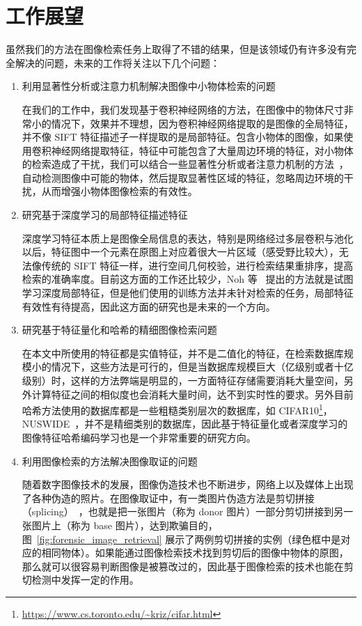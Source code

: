 \section{工作展望}
虽然我们的方法在图像检索任务上取得了不错的结果，但是该领域仍有许多没有完全解决的问题，未来的工作将关注以下几个问题：

\begin{enumerate}
\item 利用显著性分析或注意力机制解决图像中小物体检索的问题

在我们的工作中，我们发现基于卷积神经网络的方法，在图像中的物体尺寸非常小的情况下，效果并不理想，因为卷积神经网络提取的是图像的全局特征，并不像 SIFT 特征描述子一样提取的是局部特征。包含小物体的图像，如果使用卷积神经网络提取特征，特征中可能包含了大量周边环境的特征，对小物体的检索造成了干扰，我们可以结合一些显著性分析或者注意力机制的方法~\cite{Song2017DeepSA,Xiao2015TheAO,Zheng2017LearningMC}，自动检测图像中可能的物体，然后提取显著性区域的特征，忽略周边环境的干扰，从而增强小物体图像检索的有效性。

\item 研究基于深度学习的局部特征描述特征

深度学习特征本质上是图像全局信息的表达，特别是网络经过多层卷积与池化以后，特征图中一个元素在原图上对应着很大一片区域（感受野比较大），无法像传统的 SIFT 特征一样，进行空间几何校验，进行检索结果重排序，提高检索的准确率度。目前这方面的工作还比较少，Noh 等~\cite{Noh2017LargeScaleIR} 提出的方法就是试图学习深度局部特征，但是他们使用的训练方法并未针对检索的任务，局部特征有效性有待提高，因此这方面的研究也是未来的一个方向。

\item 研究基于特征量化和哈希的精细图像检索问题

在本文中所使用的特征都是实值特征，并不是二值化的特征，在检索数据库规模小的情况下，这些方法是可行的，但是当数据库规模巨大（亿级别或者十亿级别）时，这样的方法弊端是明显的，一方面特征存储需要消耗大量空间，另外计算特征之间的相似度也会消耗大量时间，达不到实时性的要求。另外目前哈希方法使用的数据库都是一些粗糙类别层次的数据库，如 CIFAR10\footnote{\url{https://www.cs.toronto.edu/~kriz/cifar.html}}，NUSWIDE~\cite{Chua2009NUSWIDEAR}，并不是精细类别的数据库，因此基于特征量化或者深度学习的图像特征哈希编码学习也是一个非常重要的研究方向。

\item 利用图像检索的方法解决图像取证的问题

随着数字图像技术的发展，图像伪造技术也不断进步，网络上以及媒体上出现了各种伪造的照片。在图像取证中，有一类图片伪造方法是剪切拼接（splicing）~\cite{Farid2009ImageFD}，也就是把一张图片（称为 donor 图片）一部分剪切拼接到另一张图片上（称为 base 图片），达到欺骗目的，图~\ref{fig:forensic_image_retrieval} 展示了两例剪切拼接的实例（绿色框中是对应的相同物体）。如果能通过图像检索技术找到剪切后的图像中物体的原图，那么就可以很容易判断图像是被篡改过的，因此基于图像检索的技术也能在剪切检测中发挥一定的作用。
\end{enumerate}







